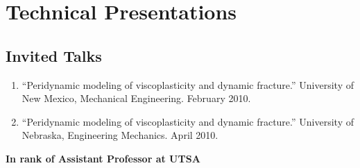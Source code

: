 \section*{Technical Presentations}

\subsection*{Invited Talks}

\ifdefined\iscockrell
\begin{enumerate}
    \item ``Peridynamic modeling of viscoplasticity and dynamic fracture.''  University of New Mexico, Mechanical Engineering. February 2010.

    \item ``Peridynamic modeling of viscoplasticity and dynamic fracture.''  University of Nebraska, Engineering Mechanics. April 2010.
\end{enumerate}
    \pagebreak[2]
    \textbf{In rank of Assistant Professor at UTSA}
